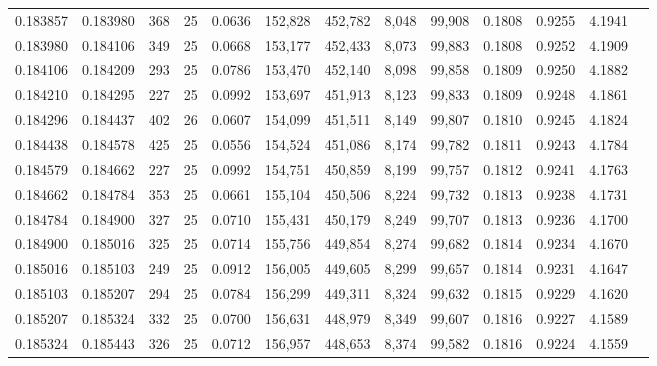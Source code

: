 \begin{tabular}{rrrrrrrrrrrrr}
0.183857 & 0.183980 &   368 &  25 &                                     0.0636 & 152,828 & 452,782 &   8,048 &  99,908 & 0.1808 & 0.9255 & 4.1941 \\
0.183980 & 0.184106 &   349 &  25 &                                     0.0668 & 153,177 & 452,433 &   8,073 &  99,883 & 0.1808 & 0.9252 & 4.1909 \\
0.184106 & 0.184209 &   293 &  25 &                                     0.0786 & 153,470 & 452,140 &   8,098 &  99,858 & 0.1809 & 0.9250 & 4.1882 \\
0.184210 & 0.184295 &   227 &  25 &                                     0.0992 & 153,697 & 451,913 &   8,123 &  99,833 & 0.1809 & 0.9248 & 4.1861 \\
0.184296 & 0.184437 &   402 &  26 &                                     0.0607 & 154,099 & 451,511 &   8,149 &  99,807 & 0.1810 & 0.9245 & 4.1824 \\
0.184438 & 0.184578 &   425 &  25 &                                     0.0556 & 154,524 & 451,086 &   8,174 &  99,782 & 0.1811 & 0.9243 & 4.1784 \\
0.184579 & 0.184662 &   227 &  25 &                                     0.0992 & 154,751 & 450,859 &   8,199 &  99,757 & 0.1812 & 0.9241 & 4.1763 \\
0.184662 & 0.184784 &   353 &  25 &                                     0.0661 & 155,104 & 450,506 &   8,224 &  99,732 & 0.1813 & 0.9238 & 4.1731 \\
0.184784 & 0.184900 &   327 &  25 &                                     0.0710 & 155,431 & 450,179 &   8,249 &  99,707 & 0.1813 & 0.9236 & 4.1700 \\
0.184900 & 0.185016 &   325 &  25 &                                     0.0714 & 155,756 & 449,854 &   8,274 &  99,682 & 0.1814 & 0.9234 & 4.1670 \\
0.185016 & 0.185103 &   249 &  25 &                                     0.0912 & 156,005 & 449,605 &   8,299 &  99,657 & 0.1814 & 0.9231 & 4.1647 \\
0.185103 & 0.185207 &   294 &  25 &                                     0.0784 & 156,299 & 449,311 &   8,324 &  99,632 & 0.1815 & 0.9229 & 4.1620 \\
0.185207 & 0.185324 &   332 &  25 &                                     0.0700 & 156,631 & 448,979 &   8,349 &  99,607 & 0.1816 & 0.9227 & 4.1589 \\
0.185324 & 0.185443 &   326 &  25 &                                     0.0712 & 156,957 & 448,653 &   8,374 &  99,582 & 0.1816 & 0.9224 & 4.1559 \\

\end{tabular}
